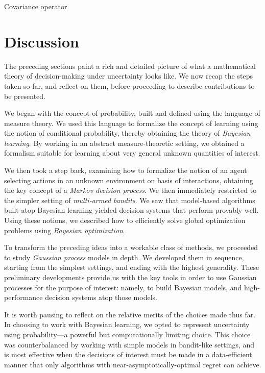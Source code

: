 \documentclass[11pt]{book}
\begin{document}
Covariance operator

\section{Discussion}

The preceding sections paint a rich and detailed picture of what a mathematical theory of decision-making under uncertainty looks like.
We now recap the steps taken so far, and reflect on them, before proceeding to describe contributions to be presented.

We began with the concept of probability, built and defined using the language of measure theory. 
We used this language to formalize the concept of learning using the notion of conditional probability, thereby obtaining the theory of \emph{Bayesian learning}.
By working in an abstract measure-theoretic setting, we obtained a formalism suitable for learning about very general unknown quantities of interest.

We then took a step back, examining how to formalize the notion of an agent selecting actions in an unknown environment on basis of interactions, obtaining the key concept of a \emph{Markov decision process}.
We then immediately restricted to the simpler setting of \emph{multi-armed bandits}.
We saw that model-based algorithms built atop Bayesian learning yielded decision systems that perform provably well.
Using these notions, we described how to efficiently solve global optimization problems using \emph{Bayesian optimization}.

To transform the preceding ideas into a workable class of methods, we proceeded to study \emph{Gaussian process} models in depth.
We developed them in sequence, starting from the simplest settings, and ending with the highest generality.
These preliminary developments provide us with the key tools in order to use Gaussian processes for the purpose of interest: namely, to build Bayesian models, and high-performance decision systems atop those models.

It is worth pausing to reflect on the relative merits of the choices made thus far.
In choosing to work with Bayesian learning, we opted to represent uncertainty using probability---a powerful but computationally limiting choice.
This choice was counterbalanced by working with simple models in bandit-like settings, and is most effective when the decisions of interest must be made in a data-efficient manner that only algorithms with near-asymptotically-optimal regret can achieve.
\end{document}
